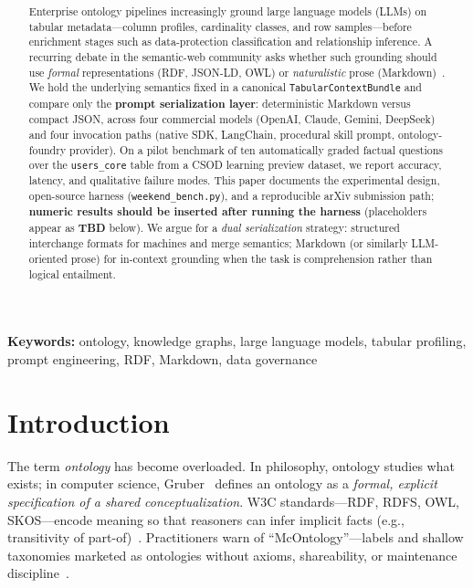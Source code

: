 \documentclass[11pt,a4paper]{article}
\title{\textbf{\PaperTitle}}
\author{
  \textbf{\AuthorName}\\
  \textit{\AuthorAffil}\\
  \texttt{\AuthorEmail}
}
\date{\PaperDate}
\begin{document}
\maketitle

\begin{abstract}
Enterprise ontology pipelines increasingly ground large language models (LLMs) on tabular metadata---column profiles, cardinality classes, and row samples---before enrichment stages such as data-protection classification and relationship inference.
A recurring debate in the semantic-web community asks whether such grounding should use \emph{formal} representations (RDF, JSON-LD, OWL) or \emph{naturalistic} prose (Markdown)~\cite{tonyseale2025mcontology}.
We hold the underlying semantics fixed in a canonical \texttt{TabularContextBundle} and compare only the \textbf{prompt serialization layer}: deterministic Markdown versus compact JSON, across four commercial models (OpenAI, Claude, Gemini, DeepSeek) and four invocation paths (native SDK, LangChain, procedural skill prompt, ontology-foundry provider).
On a pilot benchmark of ten automatically graded factual questions over the \texttt{users\_core} table from a CSOD learning preview dataset, we report accuracy, latency, and qualitative failure modes.
This paper documents the experimental design, open-source harness (\texttt{weekend\_bench.py}), and a reproducible arXiv submission path; \textbf{numeric results should be inserted after running the harness} (placeholders appear as \textbf{TBD} below).
We argue for a \emph{dual serialization} strategy: structured interchange formats for machines and merge semantics; Markdown (or similarly LLM-oriented prose) for in-context grounding when the task is comprehension rather than logical entailment.
\end{abstract}

\noindent\textbf{Keywords:} ontology, knowledge graphs, large language models, tabular profiling, prompt engineering, RDF, Markdown, data governance

\section{Introduction}
\label{sec:intro}

The term \emph{ontology} has become overloaded.
In philosophy, ontology studies what exists; in computer science, Gruber~\cite{gruber1993ontology} defines an ontology as a \emph{formal, explicit specification of a shared conceptualization}.
W3C standards---RDF, RDFS, OWL, SKOS---encode meaning so that reasoners can infer implicit facts (e.g., transitivity of part-of)~\cite{w3crdf11,w3cowl2}.
Practitioners warn of ``McOntology''---labels and shallow taxonomies marketed as ontologies without axioms, shareability, or maintenance discipline~\cite{tonyseale2025mcontology}.
\end{document}
